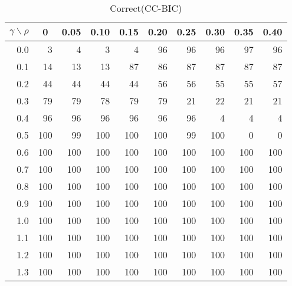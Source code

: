 \documentclass[12pt]{article}
\begin{document}
%
\begin{table}[!tbp]
\caption{Correct(CC-BIC)}
 \begin{center}
 \begin{tabular}{r|rrrrrrrrr}\hline\hline
\multicolumn{1}{c|}{$\gamma\backslash\rho$}&\multicolumn{1}{c}{0}&\multicolumn{1}{c}{0.05}&\multicolumn{1}{c}{0.10}&\multicolumn{1}{c}{0.15}&\multicolumn{1}{c}{0.20}&\multicolumn{1}{c}{0.25}&\multicolumn{1}{c}{0.30}&\multicolumn{1}{c}{0.35}&\multicolumn{1}{c}{0.40}\tabularnewline
\hline

0.0&  3&  4&  3&  4& 96& 96& 96& 97& 96\tabularnewline
0.1& 14& 13& 13& 87& 86& 87& 87& 87& 87\tabularnewline
0.2& 44& 44& 44& 44& 56& 56& 55& 55& 57\tabularnewline
0.3& 79& 79& 78& 79& 79& 21& 22& 21& 21\tabularnewline
0.4& 96& 96& 96& 96& 96& 96&  4&  4&  4\tabularnewline
0.5&100& 99&100&100&100& 99&100&  0&  0\tabularnewline
0.6&100&100&100&100&100&100&100&100&100\tabularnewline
0.7&100&100&100&100&100&100&100&100&100\tabularnewline
0.8&100&100&100&100&100&100&100&100&100\tabularnewline
0.9&100&100&100&100&100&100&100&100&100\tabularnewline
1.0&100&100&100&100&100&100&100&100&100\tabularnewline
1.1&100&100&100&100&100&100&100&100&100\tabularnewline
1.2&100&100&100&100&100&100&100&100&100\tabularnewline
1.3&100&100&100&100&100&100&100&100&100\tabularnewline
\hline
\end{tabular}

\end{center}

\end{table}
\end{document}
